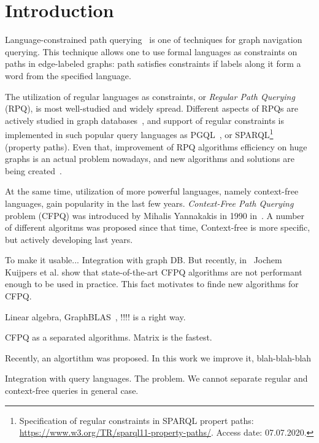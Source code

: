 \section{Introduction}


Language-constrained path querying~\cite{barrett2000formal} is one of techniques for graph navigation querying.
This technique allows one to use formal languages as constraints on paths in edge-labeled graphs: path satisfies constraints if labels along it form a word from the specified language.

The utilization of regular languages as constraints, or \textit{Regular Path Querying} (RPQ), is most well-studied and widely spread.
Different aspects of RPQs are actively studied in graph databases~\cite{10.1145/2463664.2465216, 10.1145/3104031,10.1145/2850413}, and support of regular constraints is implemented in such popular query languages as PGQL~\cite{10.1145/2960414.2960421}, or SPARQL\footnote{Specification of regular constraints in SPARQL propert paths: \url{https://www.w3.org/TR/sparql11-property-paths/}. Access date: 07.07.2020.}~\cite{10.1007/978-3-319-25007-6_1} (property paths).
Even that, improvement of RPQ algorithms efficiency on huge graphs is an actual problem nowadays, and new algorithms and solutions are being created~\cite{Wang2019,10.1145/2949689.2949711}.

At the same time, utilization of more powerful languages, namely context-free languages, gain popularity in the last few years. 
\textit{Context-Free Path Querying} problem (CFPQ) was introduced by Mihalis Yannakakis in 1990 in~\cite{Yannakakis}.
A number of different algoritms was proposed since that time, 
Context-free is more specific, but actively developing last years.


To make it usable... Integration with graph DB.
But recently, in~\cite{Kuijpers:2019:ESC:3335783.3335791} Jochem Kuijpers et al. show that state-of-the-art CFPQ algorithms are not performant enough to be used in practice.
This fact motivates to finde new algorithms for CFPQ.

Linear algebra, GraphBLAS~\cite{7761646}, !!!! is a right way.

CFPQ as a separated algorithms. 
Matrix is the fastest. 

Recently, an algortithm was proposed. 
In this work we improve it, blah-blah-blah

Integration with query languages. 
The problem. We cannot separate regular and context-free queries in general case.  

